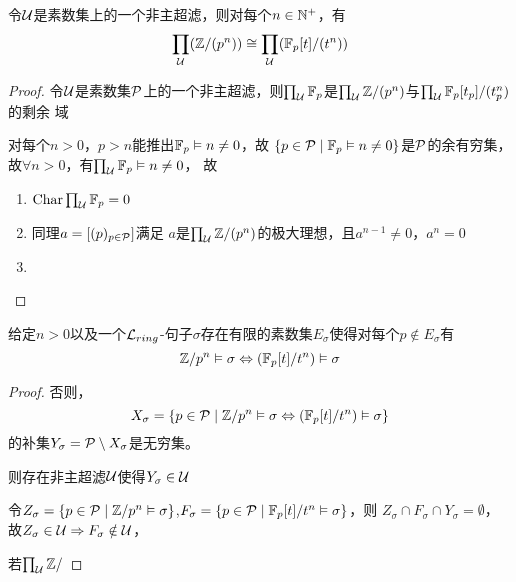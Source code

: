 \documentclass[11pt]{article}
\DeclareMathOperator{\Char}{Char}
\begin{document}
\begin{theorem}
令\(\mathcal{U}\)是素数集上的一个非主超滤，则对每个\(n\in\mathbb{N}^+\)，有
\begin{equation*}
\prod_{\mathcal{U}}(\mathbb{Z}/(p^n))\cong\prod_{\mathcal{U}}(\mathbb{F}_p[t]/(t^n))
\end{equation*}
\end{theorem}

\begin{proof}
令\(\mathcal{U}\)是素数集\(\mathcal{P}\)上的一个非主超滤，则\(\prod_{\mathcal{U}}\mathbb{F}_p\)是\(\prod_{\mathcal{U}}\mathbb{Z}/(p^n)\)与\(\prod_{\mathcal{U}}\mathbb{F}_p[t_p]/(t_p^n)\)的剩余
域

对每个\(n>0\)，\(p>n\)能推出\(\mathbb{F}_p\vDash n\neq 0\)，故
\(\{p\in\mathcal{P}\mid\mathbb{F}_p\vDash n\neq 0\}\)是\(\mathcal{P}\)的余有穷集，故\(\forall n>0\)，有\(\prod_{\mathcal{U}}\mathbb{F}_p\vDash n\neq 0\)，
故
\begin{enumerate}
\item \(\Char\prod_{\calu}\F_p=0\)
\item 同理\(a=[(p)_{p\in\mathcal{P}}]\)满足
\(a\)是\(\prod_{\mathcal{U}}\mathbb{Z}/(p^n)\)的极大理想，且\(a^{n-1}\neq 0\)，\(a^n=0\)
\item 
\end{enumerate}
\end{proof}

\begin{theorem}
给定\(n>0\)以及一个\(\mathcal{L}_{ring}\)-句子\(\sigma\)存在有限的素数集\(E_\sigma\)使得对每个\(p\notin E_\sigma\)有
\begin{equation*}
\mathbb{Z}/p^n\vDash\sigma\Leftrightarrow(\mathbb{F}_p[t]/t^n)\vDash\sigma
\end{equation*}
\end{theorem}

\begin{proof}
否则，
\begin{equation*}
X_\sigma=\{p\in\mathcal{P}\mid\mathbb{Z}/p^n\vDash\sigma\Leftrightarrow(\mathbb{F}_p[t]/t^n)\vDash\sigma\}
\end{equation*}
的补集\(Y_\sigma=\mathcal{P}\setminus X_\sigma\)是无穷集。

则存在非主超滤\(\mathcal{U}\)使得\(Y_\sigma\in\mathcal{U}\)

令\(Z_\sigma=\{p\in\mathcal{P}\mid\mathbb{Z}/p^n\vDash\sigma\}\),\(F_\sigma=\{p\in\mathcal{P}\mid\mathbb{F}_p[t]/t^n\vDash\sigma\}\)，则
\(Z_\sigma\cap F_\sigma\cap Y_\sigma=\emptyset\)，故\(Z_\sigma\in\mathcal{U}\Rightarrow F_\sigma\notin\mathcal{U}\)，

若\(\prod_{\mathcal{U}}\mathbb{Z}/\)
\end{proof}
\end{document}
